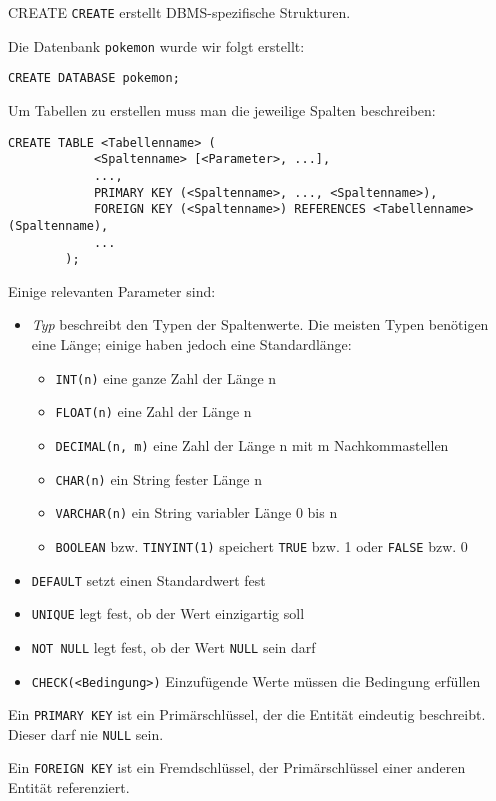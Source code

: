 \begin{sql}{CREATE}
    \texttt{CREATE} erstellt DBMS-spezifische Strukturen.

    Die Datenbank \texttt{pokemon} wurde wir folgt erstellt:

    \begin{lstlisting}[language=mysql]
        CREATE DATABASE pokemon;
    \end{lstlisting}

    Um Tabellen zu erstellen muss man die jeweilige Spalten beschreiben:

    \begin{lstlisting}[language=mysql]
        CREATE TABLE <Tabellenname> (
            <Spaltenname> [<Parameter>, ...],
            ...,
            PRIMARY KEY (<Spaltenname>, ..., <Spaltenname>),
            FOREIGN KEY (<Spaltenname>) REFERENCES <Tabellenname> (Spaltenname),
            ...
        );
    \end{lstlisting}

    Einige relevanten Parameter sind:

    \begin{itemize}
        \item \emph{Typ} beschreibt den Typen der Spaltenwerte.
            Die meisten Typen benötigen eine Länge; einige haben jedoch eine Standardlänge:
        
            \begin{itemize}
                \item \texttt{INT(n)} eine ganze Zahl der Länge n
                \item \texttt{FLOAT(n)} eine Zahl der Länge n
                \item \texttt{DECIMAL(n, m)} eine Zahl der Länge n mit m Nachkommastellen
                \item \texttt{CHAR(n)} ein String fester Länge n
                \item \texttt{VARCHAR(n)} ein String variabler Länge 0 bis n
                \item \texttt{BOOLEAN} bzw. \texttt{TINYINT(1)} speichert \texttt{TRUE} bzw. 1 oder \texttt{FALSE} bzw. 0
            \end{itemize}
        \item \texttt{DEFAULT} setzt einen Standardwert fest
        \item \texttt{UNIQUE} legt fest, ob der Wert einzigartig soll
        \item \texttt{NOT NULL} legt fest, ob der Wert \texttt{NULL} sein darf
        \item \texttt{CHECK(<Bedingung>)} Einzufügende Werte müssen die Bedingung erfüllen
    \end{itemize}

    Ein \texttt{PRIMARY KEY} ist ein Primärschlüssel, der die Entität eindeutig beschreibt.
    Dieser darf nie \texttt{NULL} sein.

    Ein \texttt{FOREIGN KEY} ist ein Fremdschlüssel, der Primärschlüssel einer anderen Entität referenziert.
\end{sql}

